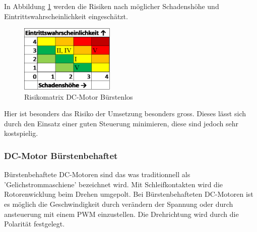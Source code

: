 \documentclass[../../../main.tex]{subfiles}
\begin{document}
    In Abbildung \ref{fig:antr_risikomatrix_buerstenlos} werden die Risiken nach möglicher Schadenshöhe und Eintrittswahrscheinlichkeit eingeschätzt.

    \begin{figure}[H]
        \centering
        \includegraphics[width=0.4\textwidth]{Antr_Risiko_DCMotor_Buerstenlos.png}
        \caption {Risikomatrix DC-Motor Bürstenlos}
        \label{fig:antr_risikomatrix_buerstenlos}
    \end{figure}

    Hier ist besonders das Risiko der Umsetzung besonders gross. Dieses lässt sich durch den Einsatz einer guten Steuerung minimieren, diese sind jedoch sehr kostspielig.

    \subsubsection{DC-Motor Bürstenbehaftet}
    
    Bürstenbehaftete DC-Motoren sind das was traditionnell als 'Gelichstrommaschiene' bezeichnet wird. Mit Schleifkontakten wird die Rotorenwicklung beim Drehen umgepolt.
    Bei Bürstenbehafteten DC-Motoren ist es möglich die Geschwindigkeit durch verändern der Spannung oder durch ansteuerung mit einem PWM einzustellen. Die Drehrichtung wird durch die Polarität festgelegt.
\end{document}
